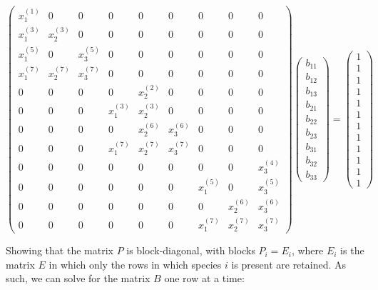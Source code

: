 \documentclass[]{book}
\begin{document}
\[
\begin{pmatrix}
x_1^{(1)} & 0 & 0      & 0 & 0 & 0     & 0 & 0 & 0 \\
x_1^{(3)} & x_2^{(3)} & 0      & 0 & 0 & 0     & 0 & 0 & 0 \\
x_1^{(5)} & 0 & x_3^{(5)}       & 0 & 0 & 0     & 0 & 0 & 0 \\
x_1^{(7)} & x_2^{(7)} & x_3^{(7)} & 0 & 0 & 0     & 0 & 0 & 0 \\
0 & 0 & 0     & 0 & x_2^{(2)} & 0     & 0 & 0 & 0 \\
0 & 0 & 0     & x_1^{(3)} & x_2^{(3)} & 0     & 0 & 0 & 0 \\
0 & 0 & 0     & 0 & x_2^{(6)} & x_3^{(6)}     & 0 & 0 & 0 \\
0 & 0 & 0     & x_1^{(7)} & x_2^{(7)} & x_3^{(7)} & 0 & 0 & 0 \\
0 & 0 & 0      & 0 & 0 & 0     & 0 & 0 & x_3^{(4)} \\
0 & 0 & 0     & 0 & 0 & 0     & x_1^{(5)} & 0 & x_3^{(5)} \\
0 & 0 & 0     & 0 & 0 & 0        & 0 & x_2^{(6)} & x_3^{(6)}\\
0 & 0 & 0     & 0 & 0 & 0        & x_1^{(7)} & x_2^{(7)} & x_3^{(7)} 
\end{pmatrix} 
\begin{pmatrix}
b_{11}\\
b_{12}\\
b_{13}\\
b_{21}\\
b_{22}\\
b_{23}\\
b_{31}\\
b_{32}\\
b_{33}
\end{pmatrix} 
= 
\begin{pmatrix}
1\\
1\\
1\\
1\\
1\\
1\\
1\\
1\\
1\\
1\\
1\\
1
\end{pmatrix}
\]

Showing that the matrix \(P\) is block-diagonal, with blocks \(P_i = E_i\), where \(E_i\) is the matrix \(E\) in which only the rows in which species \(i\) is present are retained. As such, we can solve for the matrix \(B\) one row at a time:
\end{document}
